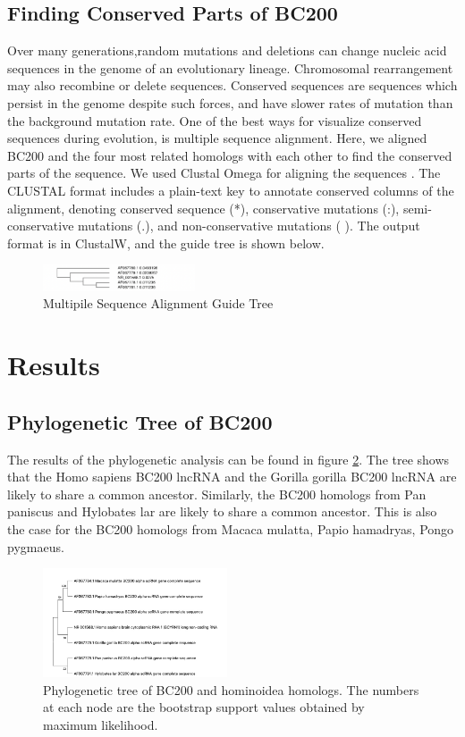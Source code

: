 \documentclass[conference]{IEEEtran}
\begin{document}
\subsection{Finding Conserved Parts of BC200}
Over many generations,random mutations and deletions can change nucleic acid sequences in the genome of an evolutionary lineage. 
Chromosomal rearrangement may also recombine or delete sequences. 
Conserved sequences are sequences which persist in the genome despite such forces, and have slower rates of mutation than the background mutation rate\cite{kimura1974some}.
One of the best ways for visualize conserved sequences during evolution, is multiple sequence alignment. 
Here, we aligned BC200 and the four most related homologs with each other to find the conserved parts of the sequence. 
We used Clustal Omega for aligning the sequences \cite{madeira2019embl}. 
The CLUSTAL format includes a plain-text key to annotate conserved columns of the alignment, denoting conserved sequence (*), conservative mutations (:), semi-conservative mutations (.), and non-conservative mutations ( ). 
The output format is in ClustalW, and the guide tree is shown below.

\begin{figure}[ht]
  \centering
  \label{fig:Guide-tree}
  \includegraphics[width=0.4\textwidth]{figs/guidetree.png}
  \caption{Multipile Sequence Alignment Guide Tree}
\end{figure}

\section{Results}\label{sec:results}

\subsection{Phylogenetic Tree of BC200}
The results of the phylogenetic analysis can be found in figure \ref{fig:phylo-tree}. 
The tree shows that the Homo sapiens BC200 lncRNA and the Gorilla gorilla BC200 lncRNA are likely to share a common ancestor. 
Similarly, the BC200 homologs from Pan paniscus and Hylobates lar are likely to share a common ancestor. 
This is also the case for the BC200 homologs from Macaca mulatta, Papio hamadryas, Pongo pygmaeus. 

\begin{figure}[ht]
  \centering
  \includegraphics[width=0.485\textwidth]{figs/phylogenetic-tree.jpg}
  \caption{Phylogenetic tree of BC200 and hominoidea homologs. The numbers at each node are the bootstrap support values obtained by maximum likelihood.}
  \label{fig:phylo-tree}
\end{figure}
\end{document}
